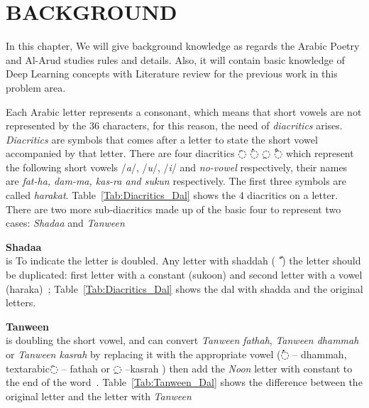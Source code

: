 \chapter{\uppercase{Background}}\label{Ch:Background}
In this chapter, We will give background knowledge as regards the Arabic Poetry and Al-Arud studies
rules and details. Also, it will contain basic knowledge of Deep Learning concepts with Literature
review for the previous work in this problem area.

Each Arabic letter represents a consonant, which means that short vowels are not
represented by the 36 characters, for this reason, the need of \textit{diacritics}
arises. \textit{Diacritics} are symbols that comes after a letter to state the
short vowel accompanied by that letter. There are four diacritics \textarabic{◌َ} \textarabic{◌ُ}
\textarabic{◌ِ} \textarabic{◌ْ} which represent the following short vowels
/\textit{a}/, /\textit{u}/, /\textit{i}/ and \textit{no-vowel} respectively,
their names are \textit{fat-ha, dam-ma, kas-ra and sukun} respectively.  The first
three symbols are called \textit{harakat}. Table~\ref{Tab:Diacritics_Dal}
shows the 4 diacritics on a letter.
There are two more sub-diacritics made up of the basic four to represent two
cases: \textit{Shadaa} and \textit{Tanween}%
\begin{definition}\label{def:shadaa_definition}
  \textbf{Shadaa}  \hfill \\
  is To indicate the letter is doubled. Any letter with shaddah (\textarabic{ ّ }) the letter should be duplicated: first letter with a constant (sukoon) and second letter with a vowel (haraka)~\cite{Alnagdawi2013}; Table~\ref{Tab:Diacritics_Dal} shows the dal with shadda and the original letters.%
\end{definition}
\begin{definition}\label{def:tanween_definition}
  \textbf{Tanween} \hfill \\
  is doubling the short vowel, and can convert \textit{Tanween fathah}, \textit{Tanween dhammah} or \textit{Tanween kasrah} by replacing it with the appropriate vowel (\textarabic{◌ُ} – dhammah, textarabic{◌َ} – fathah or \textarabic{◌ِ} –kasrah ) then add the \textit{Noon} letter with constant to the end of the word~\cite{Alnagdawi2013}. Table~\ref{Tab:Tanween_Dal}
  shows the difference between the original letter and the letter with \textit{Tanween}%
\end{definition}%


